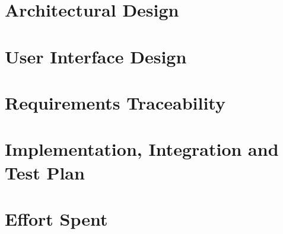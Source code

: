 \clearpage
{\section{Architectural Design}}
\label{sect:architectural design}


\clearpage
{\section{User Interface Design}}
\label{sect:user interface}


\clearpage
{\section{Requirements Traceability}}
\label{sect:requirements traceability}


\clearpage
{\section{Implementation, Integration and Test Plan}}
\label{sect:implementation, integration and test plan}


\clearpage
{\section{Effort Spent}}
\label{sect:effort}


\clearpage
{}




